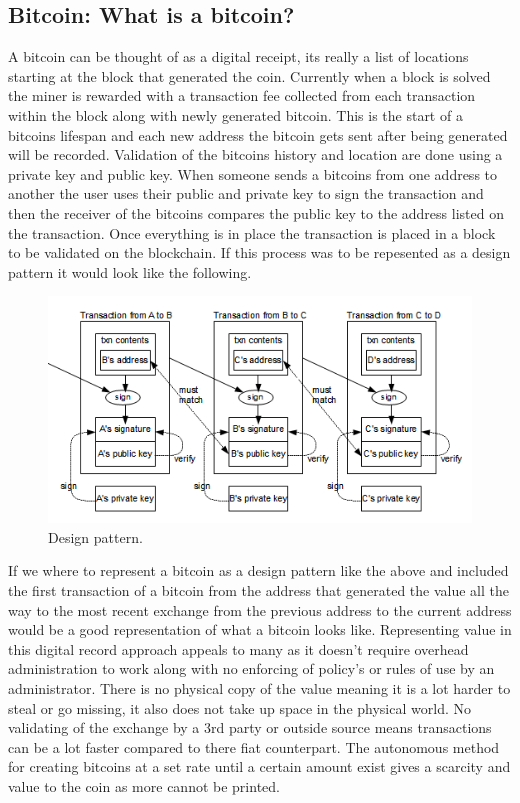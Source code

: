 \subsection{Bitcoin: What is a bitcoin?}
A bitcoin can be thought of as a digital receipt, its really a list of locations starting at the block that generated the coin. Currently when a block is solved the miner is rewarded with a transaction fee collected from each transaction within the block along with newly generated bitcoin. This is the start of a bitcoins lifespan and each new address the bitcoin gets sent after being generated will be recorded. Validation of the bitcoins history and location are done using a private key and public key. When someone sends a bitcoins from one address to another the user uses their public and private key to sign the transaction and then the receiver of the bitcoins compares the public key to the address listed on the transaction. Once everything is in place the transaction is placed in a block to be validated on the blockchain. If this process was to be repesented as a design pattern it would look like the following. \cite{BitcoinO55}

\begin{figure}[H]
\centering
\includegraphics[scale=0.55]{img/bitcoindesign.png}
\caption{Design pattern.}
\end{figure}

If we where to represent a bitcoin as a design pattern like the above and included the first transaction of a bitcoin from the address that generated the value all the way to the most recent exchange from the previous address to the current address would be a good representation of what a bitcoin looks like. Representing value in this digital record approach appeals to many as it doesn't require overhead administration  to work along with no enforcing of policy's or rules of use by an administrator. There is no physical copy of the value meaning it is a lot harder to steal or go missing, it also does not take up space in the physical world. No validating of the exchange by a 3rd party or outside source means transactions can be a lot faster compared to there fiat counterpart. The autonomous method for creating bitcoins at a set rate until a certain amount exist gives a scarcity and value to the coin as more cannot be printed.\cite{CoinDesk75}

